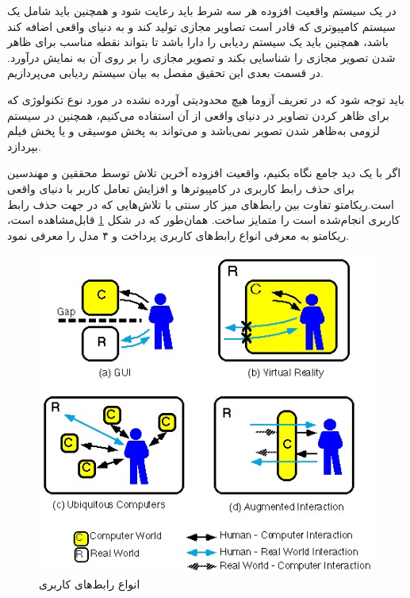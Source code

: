 در یک سیستم واقعیت افزوده هر سه شرط باید رعایت شود و همچنین باید شامل یک سیستم کامپیوتری که قادر است تصاویر مجازی تولید کند و به دنیای واقعی اضافه کند باشد، همچنین باید یک سیستم ردیابی  را دارا باشد تا بتواند نقطه مناسب برای ظاهر شدن تصویر مجازی را شناسایی بکند و تصویر مجازی را بر روی آن به نمایش درآورد. در قسمت بعدی این تحقیق مفصل به بیان سیستم ردیابی می‌پردازیم.

باید توجه شود که در تعریف آزوما هیچ محدودیتی آورده نشده در مورد نوع تکنولوژی که برای ظاهر کردن تصاویر در دنیای واقعی از آن استفاده می‌کنیم، همچنین در سیستم لزومی به‌ظاهر شدن تصویر نمی‌باشد و می‌تواند به پخش موسیقی و یا پخش فیلم بپردازد.

اگر با یک دید جامع نگاه بکنیم، واقعیت افزوده آخرین تلاش توسط محققین و مهندسین برای حذف رابط کاربری در کامپیوترها و افزایش تعامل کاربر با دنیای واقعی است.ریکامتو  تفاوت بین رابط‌های میز کار سنتی  با تلاش‌هایی که در جهت حذف رابط کاربری انجام‌شده است را متمایز ساخت\cite{Rekimoto}. همان‌طور که در شکل \ref{fig:Rekimoto} قابل‌مشاهده است، ریکامتو به معرفی انواع رابط‌های کاربری پرداخت و ۴ مدل را معرفی نمود.
\\
\begin{figure}[tb]
	\centering
	\includegraphics[width=1\linewidth]{image/style}
	\caption {انواع رابط‌های کاربری\cite{Rekimoto}}
	\label{fig:Rekimoto}
\end{figure}
